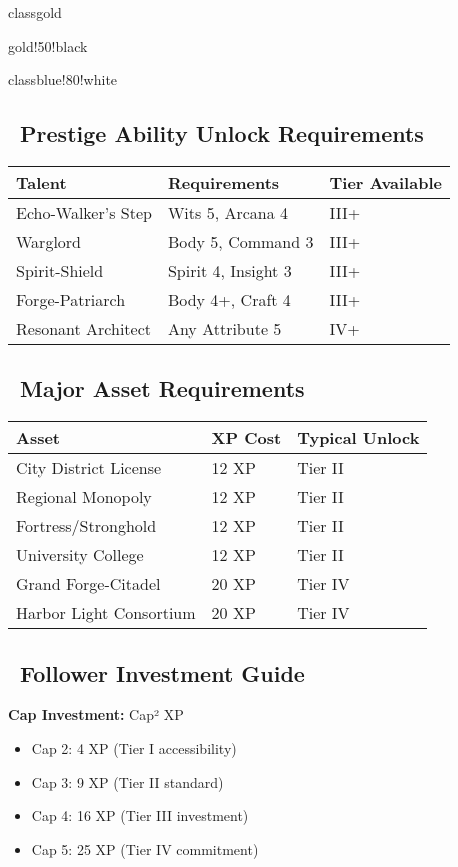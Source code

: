 \documentclass[11pt]{article}
\begin{document}
\begin{classguide}{classgold}
\begin{tierbox}{gold!50!black}
\begin{classguide}{classblue!80!white}
\subsection*{\faMedal\ Prestige Ability Unlock Requirements}

\begin{center}
\begin{tabular}{|l|l|l|}
\hline
\textbf{Talent} & \textbf{Requirements} & \textbf{Tier Available} \\
\hline
Echo-Walker's Step & Wits 5, Arcana 4 & III+ \\
Warglord & Body 5, Command 3 & III+ \\
Spirit-Shield & Spirit 4, Insight 3 & III+ \\
Forge-Patriarch & Body 4+, Craft 4 & III+ \\
Resonant Architect & Any Attribute 5 & IV+ \\
\hline
\end{tabular}
\end{center}

\subsection*{\faCastle\ Major Asset Requirements}

\begin{center}
\begin{tabular}{|l|l|l|}
\hline
\textbf{Asset} & \textbf{XP Cost} & \textbf{Typical Unlock} \\
\hline
City District License & 12 XP & Tier II \\
Regional Monopoly & 12 XP & Tier II \\
Fortress/Stronghold & 12 XP & Tier II \\
University College & 12 XP & Tier II \\
Grand Forge-Citadel & 20 XP & Tier IV \\
Harbor Light Consortium & 20 XP & Tier IV \\
\hline
\end{tabular}
\end{center}

\subsection*{\faUsers\ Follower Investment Guide}

\textbf{Cap Investment:} Cap² XP
\begin{itemize}
    \item Cap 2: 4 XP (Tier I accessibility)
    \item Cap 3: 9 XP (Tier II standard)
    \item Cap 4: 16 XP (Tier III investment)
    \item Cap 5: 25 XP (Tier IV commitment)
\end{itemize}


\end{classguide}
\end{tierbox}
\end{classguide}
\end{document}
